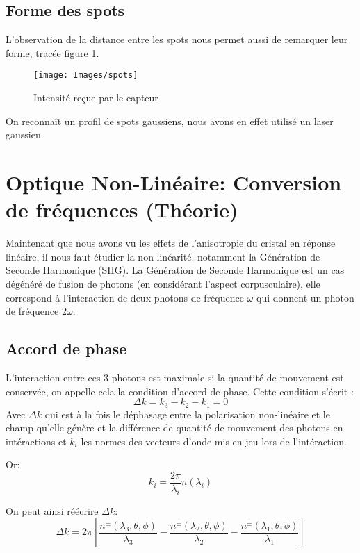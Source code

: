 \documentclass[a4paper,11pt]{report}
\begin{document}
\section{Forme des spots}
L'observation de la distance entre les spots nous permet aussi de remarquer leur forme, tracée figure \ref{formespots}.
\begin{figure}[h]
    \begin{center}
        \texttt{[image: Images/spots]}
        \caption{Intensité reçue par le capteur}
        \label{formespots}
    \end{center}
\end{figure}
On reconnaît un profil de spots gaussiens, nous avons en effet utilisé un laser gaussien.

\chapter{Optique Non-Linéaire: Conversion de fréquences (Théorie)}\label{ONLTheorie}

Maintenant que nous avons vu les effets de l'anisotropie du cristal en réponse linéaire, il nous faut étudier la non-linéarité, notamment la Génération de Seconde Harmonique (SHG). La Génération de Seconde Harmonique est un cas dégénéré de fusion de photons (en considérant l'aspect corpusculaire), elle correspond à l'interaction de deux photons de fréquence $\omega$ qui donnent un photon de fréquence 2$\omega$.

\section{Accord de phase}

L'interaction entre ces 3 photons est maximale si la quantité de mouvement est conservée, on appelle cela la condition d'accord de phase. Cette condition s'écrit :
\[\Delta k=k_3-k_2-k_1=0\]
Avec $\Delta k$ qui est à la fois le déphasage entre la polarisation non-linéaire et le champ qu'elle génère et la différence de quantité de mouvement des photons en intéractions et $k_i$ les normes des vecteurs d'onde mis en jeu lors de l'intéraction.

Or:
\[k_i=\dfrac{2\pi}{\lambda_i}n(\lambda_i)\]

On peut ainsi réécrire $\Delta k$:
\[\Delta k=2\pi\left[\dfrac{n^{\pm}(\lambda_3,\theta,\phi)}{\lambda_3}-\dfrac{n^{\pm}(\lambda_2,\theta,\phi)}{\lambda_2}-\dfrac{n^{\pm}(\lambda_1,\theta,\phi)}{\lambda_1}\right]\]
\end{document}
